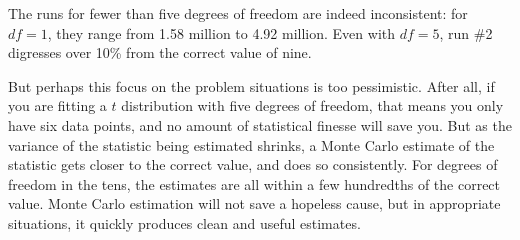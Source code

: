 \startonecol
\vspace{\baselineskip}
\iftwocol\hspace{-8.0cm} 
\else\hspace{-1.4cm} \fi
{}
\vspace{\baselineskip}
\endonecol

The runs for fewer than five degrees of freedom are indeed inconsistent:
for $df = 1$, they range from 1.58 million to 4.92 million. Even with
$df = 5$, run \#2 digresses over 10\% from the correct value of nine.

But perhaps this focus on the problem situations is too pessimistic.
After all, if you are fitting a $t$ distribution with five degrees
of freedom, that means you only have six data points, and no amount of
statistical finesse will save you. But as the variance of the statistic being
estimated shrinks, a Monte Carlo estimate of the statistic gets closer to
the correct value, and does so consistently. For degrees of freedom in the
tens, the estimates are all within a few hundredths of the correct value.
Monte Carlo estimation will not save a hopeless cause, but in
appropriate situations, it quickly produces clean and useful estimates.

